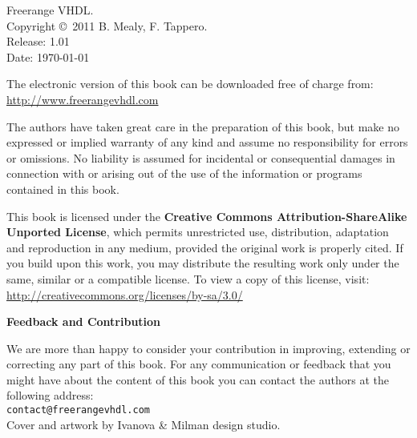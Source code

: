 %
%
%
\setcounter{page}{1}

\small
\noindent
Freerange VHDL.\\
Copyright \copyright \ 2011 B. Mealy, F. Tappero.\\
Release: 1.01\\
Date: \today
\vspace{20pt}

\noindent
The electronic version of this book can be downloaded free of charge from:\\ 
\url{http://www.freerangevhdl.com}\\

\vspace{20pt}

\noindent
The authors have taken great care in the preparation of this book, but make no expressed or implied warranty of any kind and assume no responsibility for errors or omissions. No liability is assumed for incidental or consequential damages in connection with or arising out of the use of the information or programs contained in this book.

\noindent
This book is licensed under the \textbf{Creative Commons Attribution-ShareAlike Unported License}, which permits unrestricted use, distribution, adaptation and reproduction in any medium, provided the original work is properly cited. If you build upon this work, you may distribute the resulting work only under the same, similar or a compatible license. To view a copy of this license, visit:\\
\url{http://creativecommons.org/licenses/by-sa/3.0/}
\vspace{20pt}

\noindent
{\sffamily\bfseries Feedback and Contribution}

\noindent
We are more than happy to consider your contribution in improving, extending or correcting any part of this book.
For any communication or feedback that you might have about the content of this book you can contact the authors at the following address:\\
\texttt{contact@freerangevhdl.com}\\

\vfill
\noindent
Cover and artwork by Ivanova \& Milman design studio.


